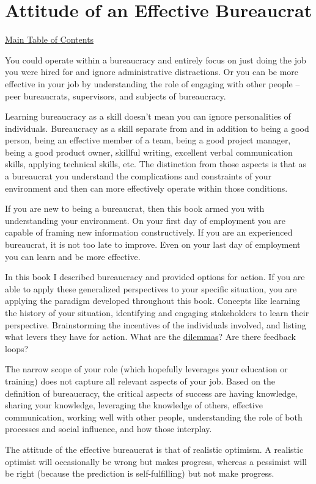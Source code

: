 \chapter{Attitude of an Effective Bureaucrat\label{sec:last-chapter}}
{\footnotesize\hyperref[sec:toc]{Main Table of Contents}}

You could operate within a \gls{bureaucracy} and entirely focus on just doing the job you were hired for and ignore administrative distractions. Or you can be more effective in your job by understanding the role of engaging with other people -- peer bureaucrats, supervisors, and subjects of bureaucracy. 

Learning bureaucracy as a skill doesn't mean you can ignore personalities of individuals. Bureaucracy as a skill separate from and in addition to being a good person, being an effective member of a team, being a good project manager, being a good product owner, skillful writing, excellent verbal communication skills, applying technical skills, etc. The distinction from those aspects is that as a bureaucrat you understand the complications and constraints of your environment and then can more effectively operate within those conditions.

If you are new to being a \gls{bureaucrat}, then this book armed you with understanding your environment. On your first day of employment you are capable of framing new information constructively.
If you are an experienced bureaucrat, it is not too late to improve. Even on your last day of employment you can learn and be more effective.

In this book I described bureaucracy and provided options for action. If you are able to apply these generalized perspectives to your specific situation, you are applying the paradigm developed throughout this book. Concepts like learning the history of your situation, identifying and engaging \glspl{stakeholder} to learn their perspective. Brainstorming the incentives of the individuals involved, and listing what levers they have for action. 
What are the \hyperref[sec:dilemma-trilemma]{dilemmas}? Are there feedback loops?



The narrow scope of your role (which hopefully leverages your education or training) does not capture all relevant aspects of your job. 
Based on the definition of \gls{bureaucracy}, the critical aspects of success are having knowledge, sharing your knowledge, leveraging the knowledge of others, effective communication, working well with other people, understanding the role of both processes and social influence, and how those interplay. 


The attitude of the effective bureaucrat  is that of realistic optimism. A realistic optimist will occasionally be wrong but makes progress, whereas a pessimist will be right (because the prediction is self-fulfilling) but not make progress.
